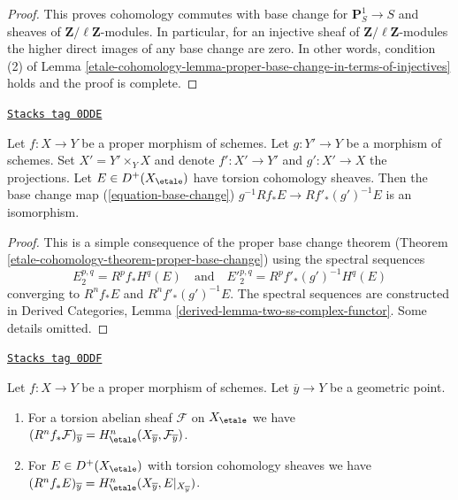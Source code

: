 \begin{proof}
\medskip\noindent
This proves cohomology commutes with base change for
$\mathbf{P}^1_S \to S$ and sheaves of $\mathbf{Z}/\ell\mathbf{Z}$-modules.
In particular, for an injective sheaf of $\mathbf{Z}/\ell\mathbf{Z}$-modules
the higher direct images of any base change are zero.
In other words, condition (2) of
Lemma \ref{etale-cohomology-lemma-proper-base-change-in-terms-of-injectives}
holds and the proof is complete.
\end{proof}

\begin{lemma}
\label{etale-cohomology-lemma-proper-base-change}
\href{https://stacks.math.columbia.edu/tag/0DDE}{\texttt{Stacks tag 0DDE}}

Let $f : X \to Y$ be a proper morphism of schemes. Let $g : Y' \to Y$ be
a morphism of schemes. Set $X' = Y' \times_Y X$ and denote
$f' : X' \to Y'$ and $g' : X' \to X$ the projections.
Let $E \in D^+(X_\etale)$ have torsion cohomology sheaves.
Then the base change map (\ref{equation-base-change})
$g^{-1}Rf_*E \to Rf'_*(g')^{-1}E$
is an isomorphism.
\end{lemma}

\begin{proof}
This is a simple consequence of the proper base change theorem
(Theorem \ref{etale-cohomology-theorem-proper-base-change}) using the spectral
sequences
$$
E_2^{p, q} = R^pf_*H^q(E)
\quad\text{and}\quad
{E'}_2^{p, q} = R^pf'_*(g')^{-1}H^q(E)
$$
converging to $R^nf_*E$ and $R^nf'_*(g')^{-1}E$.
The spectral sequences are constructed in
Derived Categories, Lemma \ref{derived-lemma-two-ss-complex-functor}.
Some details omitted.
\end{proof}

\begin{lemma}
\label{etale-cohomology-lemma-proper-base-change-stalk}
\href{https://stacks.math.columbia.edu/tag/0DDF}{\texttt{Stacks tag 0DDF}}

Let $f : X \to Y$ be a proper morphism of schemes. Let $\overline{y} \to Y$
be a geometric point.
\begin{enumerate}
\item For a torsion abelian sheaf $\mathcal{F}$ on $X_\etale$ we have
$(R^nf_*\mathcal{F})_{\overline{y}} =
H^n_\etale(X_{\overline{y}}, \mathcal{F}_{\overline{y}})$.
\item For $E \in D^+(X_\etale)$ with torsion cohomology sheaves we have
$(R^nf_*E)_{\overline{y}} =
H^n_\etale(X_{\overline{y}}, E|_{X_{\overline{y}}})$.
\end{enumerate}
\end{lemma}

